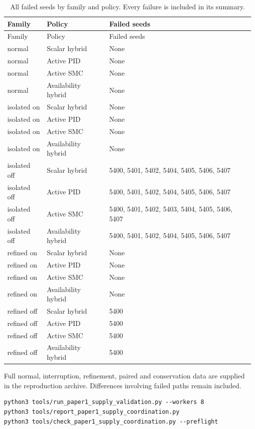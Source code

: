 \begingroup\hypersetup{hypertexnames=true}\small\setlength{\tabcolsep}{4pt}
\begin{longtable}{lp{.28\linewidth}p{.40\linewidth}}
\caption{All failed seeds by family and policy. Every failure is included in its summary.}\\\toprule
Family & Policy & Failed seeds\\\midrule\endfirsthead
\toprule
Family & Policy & Failed seeds\\\midrule\endhead
normal & Scalar hybrid & None\\
normal & Active PID & None\\
normal & Active SMC & None\\
normal & Availability hybrid & None\\
isolated on & Scalar hybrid & None\\
isolated on & Active PID & None\\
isolated on & Active SMC & None\\
isolated on & Availability hybrid & None\\
isolated off & Scalar hybrid & 5400, 5401, 5402, 5404, 5405, 5406, 5407\\
isolated off & Active PID & 5400, 5401, 5402, 5404, 5405, 5406, 5407\\
isolated off & Active SMC & 5400, 5401, 5402, 5403, 5404, 5405, 5406, 5407\\
isolated off & Availability hybrid & 5400, 5401, 5402, 5404, 5405, 5406, 5407\\
refined on & Scalar hybrid & None\\
refined on & Active PID & None\\
refined on & Active SMC & None\\
refined on & Availability hybrid & None\\
refined off & Scalar hybrid & 5400\\
refined off & Active PID & 5400\\
refined off & Active SMC & 5400\\
refined off & Availability hybrid & 5400\\
\bottomrule\end{longtable}\endgroup

Full normal, interruption, refinement, paired and conservation data are supplied in the reproduction archive. Differences involving failed paths remain included.

\begin{verbatim}
python3 tools/run_paper1_supply_validation.py --workers 8
python3 tools/report_paper1_supply_coordination.py
python3 tools/check_paper1_supply_coordination.py --preflight
\end{verbatim}
